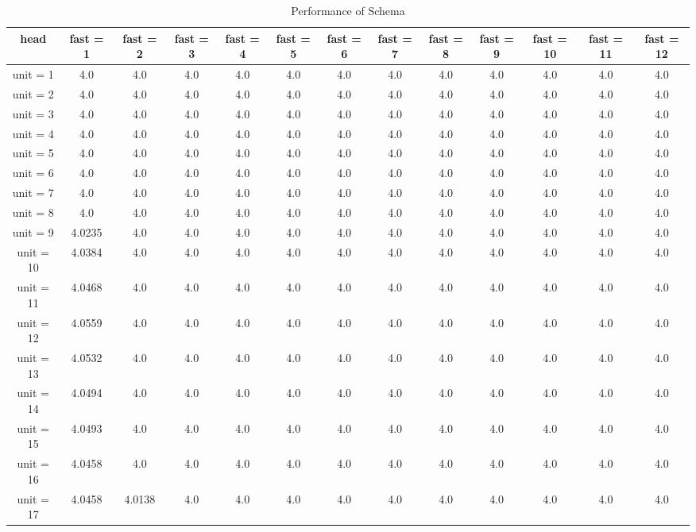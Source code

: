 \begin{table*}[ht]
\tabcolsep=0.11cm
\tiny
\caption{Performance of Schema} 
\label{performance-table}
\begin{tabular}{|c|c|c|c|c|c|c|c|c|c|c|c|c|}
\hline
head &  fast = 1 & fast = 2 & fast = 3 & fast = 4 & fast = 5 & fast = 6 & fast = 7 & fast = 8 & fast = 9 & fast = 10 & fast = 11 & fast = 12 \\ \hline
unit = 1 &
4.0 & 4.0 & 4.0 & 4.0 & 4.0 & 4.0 & 4.0 & 4.0 & 4.0 & 4.0 & 4.0 & 4.0 \\
\hline
unit = 2 &
4.0 & 4.0 & 4.0 & 4.0 & 4.0 & 4.0 & 4.0 & 4.0 & 4.0 & 4.0 & 4.0 & 4.0 \\
\hline
unit = 3 &
4.0 & 4.0 & 4.0 & 4.0 & 4.0 & 4.0 & 4.0 & 4.0 & 4.0 & 4.0 & 4.0 & 4.0 \\
\hline
unit = 4 &
4.0 & 4.0 & 4.0 & 4.0 & 4.0 & 4.0 & 4.0 & 4.0 & 4.0 & 4.0 & 4.0 & 4.0 \\
\hline
unit = 5 &
4.0 & 4.0 & 4.0 & 4.0 & 4.0 & 4.0 & 4.0 & 4.0 & 4.0 & 4.0 & 4.0 & 4.0 \\
\hline
unit = 6 &
4.0 & 4.0 & 4.0 & 4.0 & 4.0 & 4.0 & 4.0 & 4.0 & 4.0 & 4.0 & 4.0 & 4.0 \\
\hline
unit = 7 &
4.0 & 4.0 & 4.0 & 4.0 & 4.0 & 4.0 & 4.0 & 4.0 & 4.0 & 4.0 & 4.0 & 4.0 \\
\hline
unit = 8 &
4.0 & 4.0 & 4.0 & 4.0 & 4.0 & 4.0 & 4.0 & 4.0 & 4.0 & 4.0 & 4.0 & 4.0 \\
\hline
unit = 9 &
4.0235 & 4.0 & 4.0 & 4.0 & 4.0 & 4.0 & 4.0 & 4.0 & 4.0 & 4.0 & 4.0 & 4.0 \\
\hline
unit = 10 &
4.0384 & 4.0 & 4.0 & 4.0 & 4.0 & 4.0 & 4.0 & 4.0 & 4.0 & 4.0 & 4.0 & 4.0 \\
\hline
unit = 11 &
4.0468 & 4.0 & 4.0 & 4.0 & 4.0 & 4.0 & 4.0 & 4.0 & 4.0 & 4.0 & 4.0 & 4.0 \\
\hline
unit = 12 &
4.0559 & 4.0 & 4.0 & 4.0 & 4.0 & 4.0 & 4.0 & 4.0 & 4.0 & 4.0 & 4.0 & 4.0 \\
\hline
unit = 13 &
4.0532 & 4.0 & 4.0 & 4.0 & 4.0 & 4.0 & 4.0 & 4.0 & 4.0 & 4.0 & 4.0 & 4.0 \\
\hline
unit = 14 &
4.0494 & 4.0 & 4.0 & 4.0 & 4.0 & 4.0 & 4.0 & 4.0 & 4.0 & 4.0 & 4.0 & 4.0 \\
\hline
unit = 15 &
4.0493 & 4.0 & 4.0 & 4.0 & 4.0 & 4.0 & 4.0 & 4.0 & 4.0 & 4.0 & 4.0 & 4.0 \\
\hline
unit = 16 &
4.0458 & 4.0 & 4.0 & 4.0 & 4.0 & 4.0 & 4.0 & 4.0 & 4.0 & 4.0 & 4.0 & 4.0 \\
\hline
unit = 17 &
4.0458 & 4.0138 & 4.0 & 4.0 & 4.0 & 4.0 & 4.0 & 4.0 & 4.0 & 4.0 & 4.0 & 4.0 \\

\end{tabular}
\end{table*}
